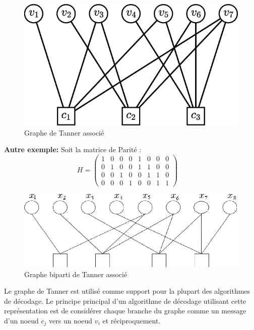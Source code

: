 \documentclass[french,nochapter,11pt]{rapportUB}
\begin{document}
\begin{figure}[!h]
  \centering
  \includegraphics[scale=0.5]{Tanner1.png}  
  \caption{Graphe de Tanner associé}
  \label{fig:Tanner1}
\end{figure}
\clearpage
\textbf{Autre exemple:}
Soit la matrice de Parité : \newline
$$H=
\begin{pmatrix}
  1 & 0 & 0 & 0 & 1 & 0 & 0 & 0 \\
  0 & 1 & 0 & 0 & 1 & 1 & 0 & 0 \\
  
  0 & 0 & 1 & 0 & 0 & 1 & 1 & 0 \\
  0 & 0 & 0 & 1 & 0 & 0 & 1 & 1 
  
  
\end{pmatrix}
\quad
$$
\begin{figure}[!h]
  \centering
  \includegraphics[scale=0.5]{Tanner2.png}  
  \caption{Graphe biparti de Tanner associé}
  \label{fig:Tanner2}
\end{figure}

Le graphe de Tanner est utilisé comme support pour la plupart des algorithmes de décodage. Le principe principal d'un algorithme de décodage utilisant cette 
représentation est de considérer chaque branche du graphe comme un message d'un noeud $c_j$ vers un noeud $v_i$ et réciproquement.

\newpage
\end{document}
